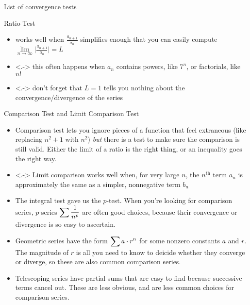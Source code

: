 \begin{frame}[t]{List of convergence tests}
\begin{Ldescription}[<+->]
\item[Ratio Test]$ $\\
\begin{itemize}
\item
works well when $\frac{a_{n+1}}{a_n}$ simplifies enough that
you can easily compute
$\lim\limits_{n\rightarrow\infty}\big|\frac{a_{n+1}}{a_n}\big|=L$
\item<.->
this often happens when $a_n$ contains powers, like $7^n$,
or factorials, like $n!$
\item<.->
don't forget that $L=1$ tells you nothing about the convergence/divergence
of the series
\end{itemize}

\vfill
\item[Comparison Test and Limit Comparison Test]$ $\\
\begin{itemize}
\item Comparison test lets you ignore pieces of a function that feel extraneous (like replacing $n^2+1$ with $n^2$) \textit{but} there is a test to make sure the comparison is still valid. Either the limit of a ratio is the right thing, or an inequality goes the right way.
\item<.->
Limit comparison works well when, for very large $n$, the $n^{\mathrm{th}}$ term
$a_n$ is approximately the same as a simpler, nonnegative term $b_n$

\end{itemize}

\end{Ldescription}
\end{frame}

\begin{frame}[t]
\begin{itemize}[<+->]
\item The integral test gave us the $p$-test. When you're looking for comparison series, $p$-series $\displaystyle\sum \frac{1}{n^p}$ are often good choices, because their convergence or divergence is so easy to ascertain.\vfill

\item Geometric series have the form $\displaystyle\sum a \cdot r^n$ for some nonzero constants $a$ and $r$. The magnitude of $r$ is all you need to know to deicide whether they converge or diverge, so these are also common comparison series.
\vfill

\item Telescoping series have partial sums that are easy to find because successive terms cancel out. These are less obvious, and are less common choices for comparison series.
\end{itemize}
\end{frame}

